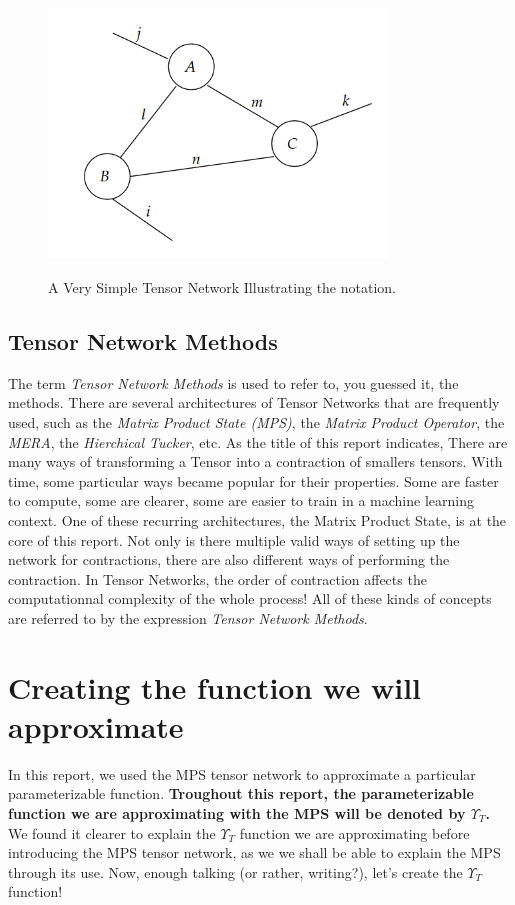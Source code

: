 \documentclass{article}
\theoremstyle{definition}
\theoremstyle{definition}
\begin{document}
\begin{figure}[hbt!]
    \centering
    \caption{A Very Simple Tensor Network Illustrating the notation.}
    \includegraphics[width=0.8\textwidth]{images/2023-04-21-16-44-53.png}
    \label{fig:tensor_net}
\end{figure}

\subsection{Tensor Network Methods}
The term {\it Tensor Network Methods} is used to refer to, you guessed it, the methods.
There are several architectures of Tensor Networks that are frequently used, such as the {\it Matrix Product State (MPS)}, the \emph{Matrix Product Operator}, the \emph{MERA}, the \emph{Hierchical Tucker}, etc. As the title of this report indicates, 
There are many ways of transforming a Tensor into a contraction of smallers tensors. 
With time, some particular ways became popular for their properties. 
Some are faster to compute, some are clearer, some are easier to train in a machine learning context. 
One of these recurring architectures, the Matrix Product State, is at the core of this report.
Not only is there multiple valid ways of setting up the network for contractions, there are also different ways of performing the contraction.
In Tensor Networks, the order of contraction affects the computationnal complexity of the whole process!
All of these kinds of concepts are referred to by the expression \emph{Tensor Network Methods}. 

\section{Creating the function we will approximate}
In this report, we used the MPS tensor network to approximate a particular parameterizable function.
{\bf Troughout this report, the parameterizable function we are approximating with the MPS will be denoted by $\Upsilon_{T}$. }
We found it clearer to explain the $\Upsilon_{T}$ function we are approximating before introducing the MPS tensor network, as we we shall be able to explain the MPS through its use.
Now, enough talking (or rather, writing?), let's create the $\Upsilon_{T}$ function!
\end{document}
